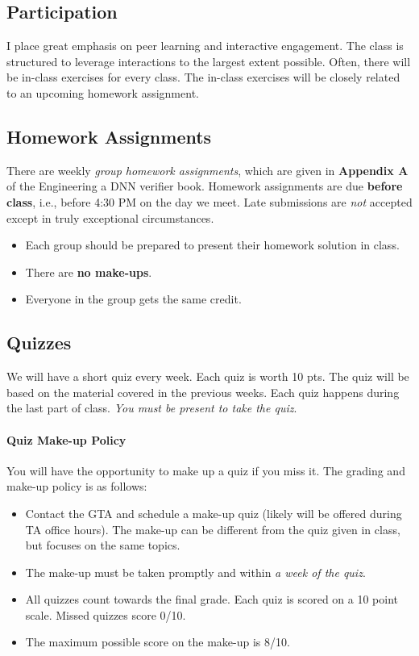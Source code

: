 \documentclass[11pt]{article}
\begin{document}
\subsection{Participation}

I place great emphasis on peer learning and interactive engagement. The class is structured to leverage interactions to the largest extent possible. Often, there will be in-class exercises for every class. The in-class exercises will be closely related to an upcoming homework assignment.


\subsection{Homework Assignments}\label{homework-assignments}

There are weekly \emph{group homework assignments}, which are given in \textbf{Appendix A} of the Engineering a DNN verifier book. Homework assignments are due \textbf{before class}, i.e., before 4:30 PM on the day we meet. Late submissions are \emph{not} accepted except in truly exceptional circumstances.

\begin{itemize}
\item
Each group should be prepared to present their homework solution in
class.

\item There are \textbf{no make-ups}.
\item Everyone in the group gets the same credit.
\end{itemize}



\subsection{Quizzes}\label{weekly-quizzes}

We will have a short quiz every week. Each quiz is worth 10 pts. The quiz will be based on the material covered in the previous weeks. Each quiz happens during the last part of class. \emph{You must be present to take the quiz}.


\paragraph{Quiz Make-up Policy} You will have the opportunity to make up a quiz if you miss it. The grading and make-up policy is as follows:

\begin{itemize}
\item Contact the GTA and schedule a make-up quiz (likely will be offered during TA office hours). The make-up can be different from the quiz given in class, but focuses on the same topics.
\item
  The make-up must be taken promptly and within \emph{a week of the quiz}.
\item
  All quizzes count towards the final grade. Each quiz is scored on a 10
  point scale. Missed quizzes score 0/10.
\item
  The maximum possible score on the make-up is 8/10. 

\end{itemize}
\end{document}
